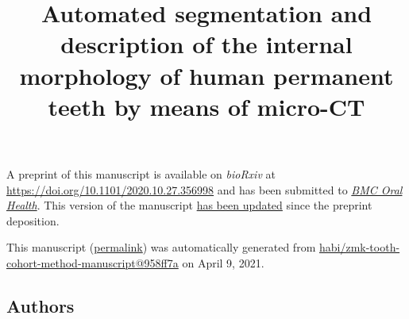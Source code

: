\documentclass[
  american,
]{article}
\title{Automated segmentation and description of the internal morphology of human permanent teeth by means of micro-CT}
\author{}
\date{}
\begin{document}
\maketitle

A preprint of this manuscript is available on \emph{bioRxiv} at \url{https://doi.org/10.1101/2020.10.27.356998} and has been submitted to \href{https://bmcoralhealth.biomedcentral.com/}{\emph{BMC Oral Health}}.
This version of the manuscript \href{https://github.com/habi/zmk-tooth-cohort-method-manuscript/compare/f9b3333c625228f4f28211a34f381b9f87c430b0...958ff7a03ef556d60d839c5a6e14485473deaa70}{has been updated} since the preprint deposition.

This manuscript
(\href{https://habi.github.io/zmk-tooth-cohort-method-manuscript/v/958ff7a03ef556d60d839c5a6e14485473deaa70/}{permalink})
was automatically generated
from \href{https://github.com/habi/zmk-tooth-cohort-method-manuscript/tree/958ff7a03ef556d60d839c5a6e14485473deaa70}{habi/zmk-tooth-cohort-method-manuscript@958ff7a}
on April 9, 2021.

\hypertarget{authors}{%
\subsection{Authors}\label{authors}}
\end{document}
